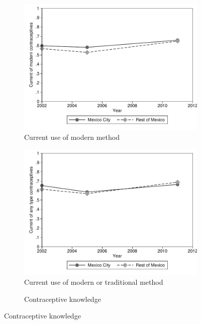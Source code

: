\documentclass[a4paper, 11pt]{article}
\begin{document}
\begin{spacing}{1.4}
\begin{figure}[H]
   	\begin{subfigure}{.3\textwidth}
   		\centering	\caption{Current use of modern method}\label{modmethod}
   		\includegraphics[scale=0.3]{figures/Trend_ModMethod.pdf}
   	\end{subfigure}%
   	\begin{subfigure}{.3\textwidth}
   		\centering\caption{Current use of modern or traditional method}\label{anymethod}
   		\includegraphics[scale=0.3]{figures/Trend_AnyMethod.pdf}
   	\end{subfigure}%
   	\begin{subfigure}{.3\textwidth}
   		\centering	\caption{Contraceptive knowledge}	\label{knowledge}

\end{subfigure}
\end{figure}
\end{spacing}
\end{document}
